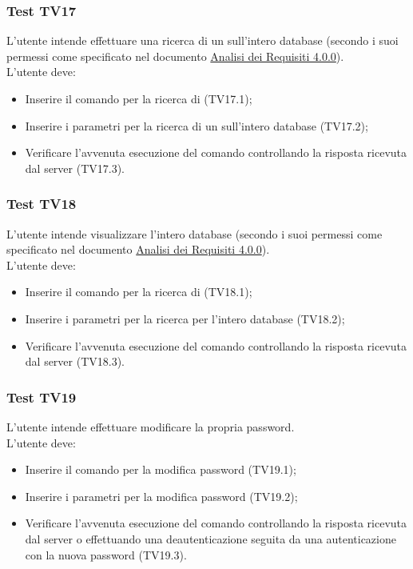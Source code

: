\documentclass{scalatekids-article}
\begin{document}
\subsubsection{Test TV17}

L'utente intende effettuare una ricerca di un  sull'intero database (secondo i suoi permessi come specificato nel documento \href{run:../Esterni/AnalisiDeiRequisiti\_v4.0.0.pdf}{Analisi dei Requisiti 4.0.0}).\\
L'utente deve:
\begin{itemize}
\item Inserire il comando per la ricerca di  (TV17.1);
\item Inserire i parametri per la ricerca di un  sull'intero database (TV17.2);
\item Verificare l'avvenuta esecuzione del comando controllando la risposta ricevuta dal server (TV17.3).
\end{itemize}

\subsubsection{Test TV18}

L'utente intende visualizzare l'intero database (secondo i suoi permessi come specificato nel documento \href{run:../Esterni/AnalisiDeiRequisiti\_v4.0.0.pdf}{Analisi dei Requisiti 4.0.0}).\\
L'utente deve:
\begin{itemize}
\item Inserire il comando per la ricerca di  (TV18.1);
\item Inserire i parametri per la ricerca per l'intero database (TV18.2);
\item Verificare l'avvenuta esecuzione del comando controllando la risposta ricevuta dal server (TV18.3).
\end{itemize}

\subsubsection{Test TV19}

L'utente intende effettuare modificare la propria password.\\
L'utente deve:
\begin{itemize}
\item Inserire il comando per la modifica password (TV19.1);
\item Inserire i parametri per la modifica password (TV19.2);
\item Verificare l'avvenuta esecuzione del comando controllando la risposta ricevuta dal server o effettuando una deautenticazione seguita da una autenticazione con la nuova password (TV19.3).
\end{itemize}
\end{document}

